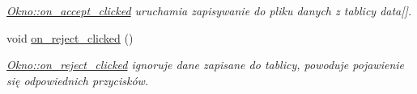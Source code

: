 \begin{DoxyCompactItemize}
\begin{DoxyCompactList}\small\item\em \hyperlink{class_okno_a6fea95038d5967dd336b87935b97170c}{Okno\+::on\+\_\+accept\+\_\+clicked} uruchamia zapisywanie do pliku danych z tablicy data\mbox{[}\mbox{]}. \end{DoxyCompactList}\item 
void \hyperlink{class_okno_a15073474701e4bec563b6a2cdad11ac4}{on\+\_\+reject\+\_\+clicked} ()\hypertarget{class_okno_a15073474701e4bec563b6a2cdad11ac4}{}\label{class_okno_a15073474701e4bec563b6a2cdad11ac4}

\begin{DoxyCompactList}\small\item\em \hyperlink{class_okno_a15073474701e4bec563b6a2cdad11ac4}{Okno\+::on\+\_\+reject\+\_\+clicked} ignoruje dane zapisane do tablicy, powoduje pojawienie się odpowiednich przycisków. \end{DoxyCompactList}\end{DoxyCompactItemize}

